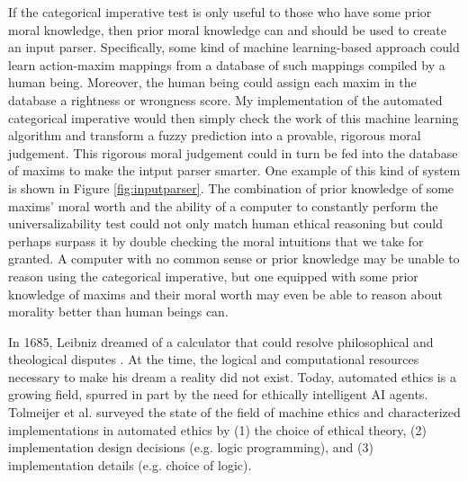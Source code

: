 \begin{isabellebody}
\begin{isamarkuptext}
If the categorical imperative test is only useful to those who have some prior moral knowledge, then prior moral
knowledge can and should be used to create an input parser. Specifically, some kind of machine learning-based approach
could learn action-maxim mappings from a database of such mappings compiled by a human being. Moreover, 
the human being could assign each maxim in the database a rightness or wrongness score. My implementation
of the automated categorical imperative would then simply check the work of this machine learning algorithm and transform
a fuzzy prediction into a provable, rigorous moral judgement. This rigorous moral judgement
could in turn be fed into the database of maxims to make the intput parser smarter. One example of 
this kind of system is shown in Figure \ref{fig:inputparser}. The combination of 
prior knowledge of some maxims' moral worth and the ability of a computer to constantly perform the
universalizability test could not only match human ethical reasoning but could perhaps surpass it
by double checking the moral intuitions that we take for granted. A computer with no common sense or prior knowledge
may be unable to reason using the categorical imperative, but one equipped with some prior knowledge
of maxims and their moral worth may even be able to reason about morality better than human beings can.%
\end{isamarkuptext}\isamarkuptrue%
%
\isadelimdocument
%
\endisadelimdocument
%
\isatagdocument
%
\isamarkuptrue%
%
\endisatagdocument
{\isafolddocument}%
%
\isadelimdocument
%
\endisadelimdocument
%
\begin{isamarkuptext}%
In 1685, Leibniz dreamed of a calculator that could resolve philosophical and theological 
disputes \citep{leibniz}. At the time, the logical and computational resources necessary to make his 
dream a reality did not exist. Today, automated ethics is a growing field, spurred in part by the 
need for ethically intelligent AI agents. Tolmeijer et al. surveyed the state of the field of 
machine ethics \citep{mesurvey} and characterized implementations in automated ethics by (1) the choice 
of ethical theory, (2) implementation design decisions (e.g. logic programming), and (3) implementation 
details (e.g. choice of logic). 


\end{isamarkuptext}
\end{isabellebody}
